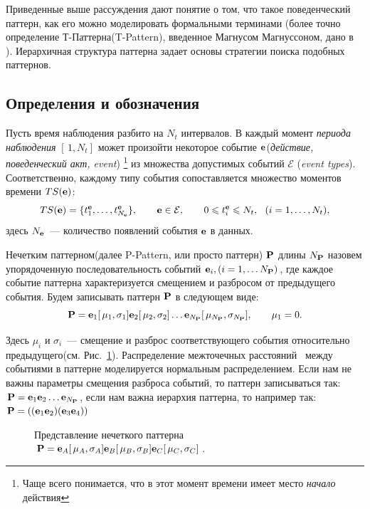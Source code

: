 \documentclass[12pt,fсeqn]{article}
\begin{document}
Приведенные выше рассуждения дают понятие о том, что такое поведенческий паттерн, как его можно моделировать формальными терминами
(более точно определение Т-Паттерна(T-Pattern), введенное Магнусом Магнуссоном, дано в~\cite{Magnusson} ).
Иерархичная структура паттерна задает основы стратегии поиска подобных паттернов.

\subsection{ Определения и обозначения } \label{sec:defs}
Пусть время наблюдения разбито на $N_t$ интервалов. В каждый момент {\itshape периода наблюдения} $[\,1,N_t]$ 
может произойти некоторое событие ${\bf e}$({\itshape действие, поведенческий акт, event}) 
\footnote{ Чаще всего понимается, что в этот момент времени имеет место {\itshape начало} действия} 
из множества допустимых событий $\mathcal{E}$ ({\itshape event types}). Соответственно, каждому типу события сопоставляется множество моментов 
времени $TS({\bf e})$:
$$
TS({\bf e}) = \{ t^{{\bf e}}_1,\dots, t^{{\bf e}}_{N_{{\bf e}} } \}, 
\qquad {\bf e}\in\mathcal{E},\qquad
0\leqslant t^{{\bf e}}_i \leqslant N_t,~~(i=1,\dots,N_t),
$$
здесь $N_{{\bf e}}$~--- количество появлений события ${\bf e}$ в данных.

Нечетким паттерном(далее P-Pattern, или просто паттерн)  ${\bf P}$ длины $N_{{\bf P}}$ назовем упорядоченную последовательность событий ${\bf e}_i, (i=1,\dots N_{{\bf P}})$, 
где каждое событие паттерна характеризуется смещением и разбросом от предыдущего события. Будем записывать паттерн
${\bf P}$ в следующем виде:
$$ {\bf P}={\bf e}_1[\,\mu_1,\sigma_1]{\bf e}_2[\,\mu_2,\sigma_2]\dots{\bf e}_{N_{{\bf P}}}[\,\mu_{N_{{\bf P}}},\sigma_{N_{{\bf P}}}], \qquad \mu_1=0. $$

Здесь $\mu_i$ и $\sigma_i$~--- смещение и разброс соответствующего события относительно предыдущего(см. Рис.~\ref{fig:ppttern}). 
Распределение межточечных расстояний~\cite[c.~138]{Shurygin} между событиями в паттерне моделируется нормальным распределением. 
Если нам не важны параметры смещения разброса событий, то паттерн записываться так: ${\bf P}={\bf e}_1{\bf e}_2\dots{\bf e}_{N_{{\bf P}}}$,
если нам важна иерархия паттерна, то например так: ${\bf P}=(({\bf e}_1{\bf e}_2)({\bf e}_3{\bf e}_4))$ 


\begin{figure}[H]
\noindent{}
\caption{Представление нечеткого паттерна $ {\bf P}={\bf e}_A[\,\mu_A,\sigma_A]{\bf e}_B[\,\mu_B,\sigma_B]{\bf e}_C[\,\mu_C,\sigma_C]$. }
\label{fig:ppttern}
\end{figure}
\end{document}
